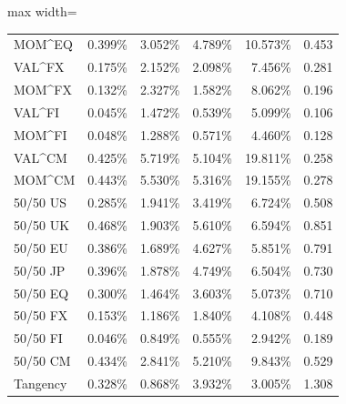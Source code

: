 \documentclass[11pt,letterpaper]{article}
\begin{document}
\begin{table}[H]
\begin{adjustbox}{max width=\linewidth}
\begin{tabular}{@{}lrrrrr@{}}
MOM\textasciicircum{}EQ & 0.399\% & 3.052\% & 4.789\% & 10.573\% & 0.453 \\
VAL\textasciicircum{}FX & 0.175\% & 2.152\% & 2.098\% & 7.456\% & 0.281 \\
MOM\textasciicircum{}FX & 0.132\% & 2.327\% & 1.582\% & 8.062\% & 0.196 \\
VAL\textasciicircum{}FI & 0.045\% & 1.472\% & 0.539\% & 5.099\% & 0.106 \\
MOM\textasciicircum{}FI & 0.048\% & 1.288\% & 0.571\% & 4.460\% & 0.128 \\
VAL\textasciicircum{}CM & 0.425\% & 5.719\% & 5.104\% & 19.811\% & 0.258 \\
MOM\textasciicircum{}CM & 0.443\% & 5.530\% & 5.316\% & 19.155\% & 0.278 \\
50/50 US & 0.285\% & 1.941\% & 3.419\% & 6.724\% & 0.508 \\
50/50 UK & 0.468\% & 1.903\% & 5.610\% & 6.594\% & 0.851 \\
50/50 EU & 0.386\% & 1.689\% & 4.627\% & 5.851\% & 0.791 \\
50/50 JP & 0.396\% & 1.878\% & 4.749\% & 6.504\% & 0.730 \\
50/50 EQ & 0.300\% & 1.464\% & 3.603\% & 5.073\% & 0.710 \\
50/50 FX & 0.153\% & 1.186\% & 1.840\% & 4.108\% & 0.448 \\
50/50 FI & 0.046\% & 0.849\% & 0.555\% & 2.942\% & 0.189 \\
50/50 CM & 0.434\% & 2.841\% & 5.210\% & 9.843\% & 0.529 \\
Tangency & 0.328\% & 0.868\% & 3.932\% & 3.005\% & 1.308 \\
\bottomrule
\end{tabular}
\end{adjustbox}
\endgroup

\end{table}
\end{document}
